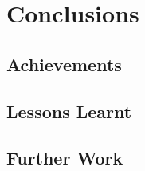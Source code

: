 
    
    \chapter{Conclusions}

    \section{Achievements}
    
    \section{Lessons Learnt}

    \section{Further Work}
    
